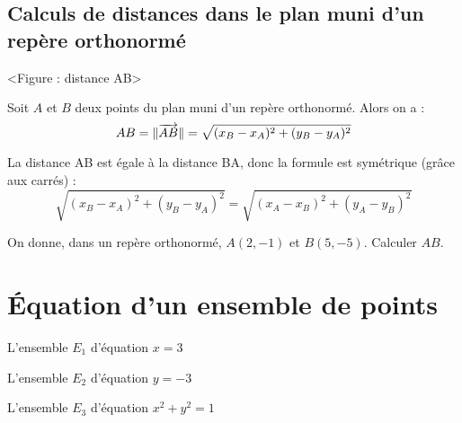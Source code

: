 \documentclass[a4paper,11pt,DIV18,BCOR0mm]{scrartcl}
\begin{document}

\subsection{Calculs de distances dans le plan muni d'un repère orthonormé}
\begin{center}
 <Figure : distance AB>
\end{center}
\begin{theoreme}
 Soit $A$ et $B$ deux points du plan muni d'un repère orthonormé. Alors on a :
\[
 AB=\|\overrightarrow{AB}\|=\sqrt{(x_B-x_A)^2+(y_B-y_A)^2}
\]
\end{theoreme}
\begin{remarque}
 La distance AB est égale à la distance BA, donc la formule est symétrique (grâce aux carrés) :
\[
 \sqrt{(x_B-x_A)^2+(y_B-y_A)^2}=\sqrt{(x_A-x_B)^2+(y_A-y_B)^2}
\]

\end{remarque}

\begin{exemple}
 On donne, dans un repère orthonormé, $A(2,-1)$ et $B(5,-5)$. Calculer $AB$.
\end{exemple}



\section{\'Equation d'un ensemble de points}
\begin{exemple}
 L'ensemble $E_1$ d'équation $x=3$
\end{exemple}
\begin{exemple}
 L'ensemble $E_2$ d'équation $y=-3$
\end{exemple}
\begin{exemple}
 L'ensemble $E_3$ d'équation $x^2+y^2=1$
\end{exemple}
\end{document}
